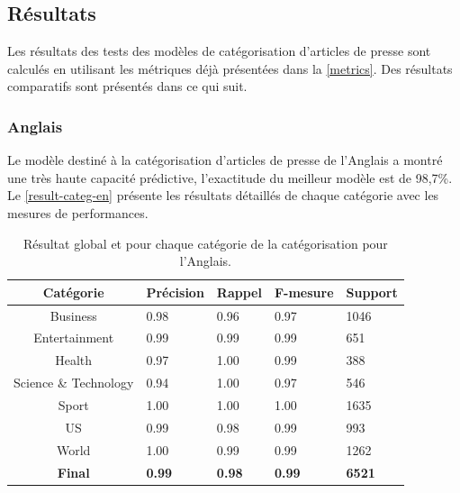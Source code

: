\subsection{Résultats}\label{result-categ}
    Les résultats des tests des modèles de catégorisation d'articles de presse sont calculés en utilisant les métriques déjà présentées dans la \autoref{metrics}. Des résultats comparatifs sont présentés dans ce qui suit.
    \subsubsection{Anglais}
    Le modèle destiné à la catégorisation d'articles de presse de l'Anglais a montré une très haute capacité prédictive, l'exactitude du meilleur modèle est de 98,7\%. Le \autoref{result-categ-en} présente les résultats détaillés de chaque catégorie avec les mesures de performances.
    \begin{table}[H]
        \begin{center}
            \begin{tabular}{|c|C{2cm}|C{2cm}|C{2cm}|C{2cm}|}
                \hline
                \textbf{Catégorie} &  \textbf{Précision} &  \textbf{Rappel} &  \textbf{F-mesure} &  \textbf{Support} \\
                \hline
                Business & 0.98 & 0.96 & 0.97 & 1046 \\
                Entertainment & 0.99 & 0.99 & 0.99 & 651 \\
                Health & 0.97 & 1.00 & 0.99 & 388 \\
                Science \& Technology & 0.94 & 1.00 & 0.97 & 546 \\
                Sport & 1.00 & 1.00 & 1.00 & 1635 \\
                US & 0.99 & 0.98 & 0.99 & 993 \\
                World & 1.00 & 0.99 & 0.99 & 1262 \\                          
                \textbf{Final} & \textbf{0.99} & \textbf{0.98} & \textbf{0.99} & \textbf{6521} \\
                \hline
            \end{tabular}
        \end{center}
        \caption{Résultat global et pour chaque catégorie de la catégorisation pour l'Anglais.}
        \label{result-categ-en}
    \end{table}

